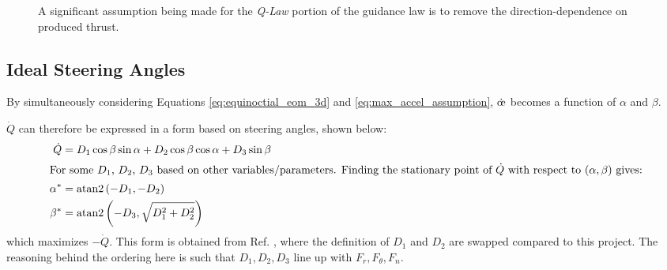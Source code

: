 \begin{figure}
  \centering
  \caption{A significant assumption being made for the \textit{Q-Law} portion of the guidance law is to remove the direction-dependence on produced thrust.}
  \label{fig:thrust_curve}
\end{figure}

\subsection{Ideal Steering Angles}
By simultaneously considering Equations \ref{eq:equinoctial_eom_3d} and \ref{eq:max_accel_assumption}, \(\dot{\moe}\) becomes a function of \(\alpha\) and \(\beta\).

\(\dot{Q}\) can therefore be expressed in a form based on steering angles, shown below:
\begin{align}
  \dot{Q}  & = D_1 \cos \beta \sin \alpha + D_2 \cos \beta \cos \alpha + D_3 \sin \beta \label{eq:q_dot_angles_form} \\
  \intertext{For some \(D_1\), \(D_2\), \(D_3\) based on other variables/parameters. Finding the stationary point of \(\dot{Q}\) with respect to \((\alpha, \beta)\) gives:}
  \alpha^* & = \mathrm{atan2}\left(-D_1, -D_2\right) \label{eq:alpha_star}                                           \\
  \beta^*  & = \mathrm{atan2}\left(-D_3, \sqrt{D_1^2 + D_2^2}\right) \label{eq:beta_star}
\end{align}
which maximizes \(-\dot{Q}\). This form is obtained from Ref. \cite{vargaperez2016}, where the definition of \(D_1\) and \(D_2\) are swapped compared to this project. The reasoning behind the ordering here is such that \(D_1, D_2, D_3\) line up with \(F_r, F_\theta, F_n\).

